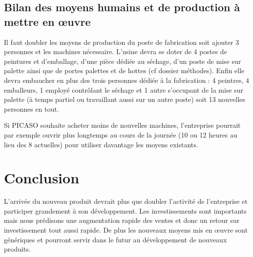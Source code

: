 \documentclass[a4paper]{../TPInsa}
\begin{document}
	\subsection{Bilan des moyens humains et de production à mettre en œuvre}

	Il faut doubler les moyens de production du poste de fabrication soit ajouter 3 personnes et les machines nécessaire. 
	L'usine devra se doter de 4 postes de peintures et d'emballage, d'une pièce dédiée au séchage, d'un poste de mise sur palette ainsi que de portes palettes et de hottes (cf dossier méthodes). 
	Enfin elle devra embaucher en plus des trois personnes dédiée à la fabrication : 4 peintres, 4 emballeurs, 1 employé contrôlant le séchage et 1 autre s'occupant de la mise sur palette (à temps partiel ou travaillant aussi sur un autre poste) soit 13 nouvelles personnes en tout. 
	
	Si PICASO souhaite acheter moins de nouvelles machines, l'entreprise pourrait par exemple ouvrir plus longtemps au cours de la journée (10 ou 12 heures au lieu des 8 actuelles) pour utiliser davantage les moyens existants. 

	\section{Conclusion}

L'arrivée du nouveau produit devrait plus que doubler l'activité de l'entreprise et participer grandement à son développement. Les investissements sont importants mais nous prédisons une augmentation rapide des ventes et donc un retour sur investissement tout aussi rapide. De plus les nouveaux moyens mis en œuvre sont génériques et pourront servir dans le futur au développement de nouveaux produits. 




















	
\end{document}
